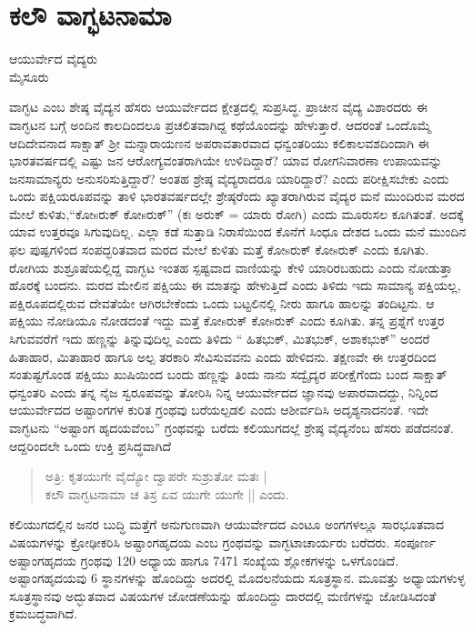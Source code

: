 \chapter{ಕಲೌ ವಾಗ್ಭಟನಾಮಾ} 

\begin{center}
\smallskip

ಆಯುರ್ವೇದ ವೈದ್ಯರು\\
ಮೈಸೂರು
\addrule
\end{center}

ವಾಗ್ಭಟ ಎಂಬ ಶೇಷ್ಠ ವೈದ್ಯನ ಹೆಸರು ಆಯುರ್ವೇದದ ಕ್ಷೇತ್ರದಲ್ಲಿ ಸುಪ್ರಸಿದ್ಧ. ಪ್ರಾಚೀನ ವೈದ್ಯ ವಿಶಾರದರು ಈ ವಾಗ್ಭಟನ ಬಗ್ಗೆ ಅಂದಿನ ಕಾಲದಿಂದಲೂ ಪ್ರಚಲಿತವಾಗಿದ್ದ ಕಥೆಯೊಂದನ್ನು ಹೇಳುತ್ತಾರೆ. ಆದರಂತೆ ಒಂದೊಮ್ಮೆ ಆದಿದೇವನಾದ  ಸಾಕ್ಷಾತ್ ಶ್ರೀ ಮನ್ನಾರಾಯಣನ ಅಪರಾವತಾರವಾದ ಧನ್ವಂತರಿಯು ಕಲಿಕಾಲವಶದಿಂದಾಗಿ ಈ ಭಾರತವರ್ಷದಲ್ಲಿ ಎಷ್ಟು ಜನ ಆರೋಗ್ಯವಂತರಾಗಿಯೇ ಉಳಿದಿದ್ದಾರೆ? ಯಾವ ರೋಗನಿವಾರಣಾ ಉಪಾಯವನ್ನು ಜನಸಾಮಾನ್ಯರು ಅನುಸರಿಸುತ್ತಿದ್ದಾರೆ? ಅಂತಹ ಶ್ರೇಷ್ಠ ವೈದ್ಯರಾದರೂ ಯಾರಿದ್ದಾರೆ? ಎಂದು ಪರೀಕ್ಷಿಸಬೇಕು ಎಂದು ಒಂದು ಪಕ್ಷಿಯರೂಪವನ್ನು ತಾಳಿ ಭಾರತವರ್ಷದಲ್ಲೇ ಶ್ರೇಷ್ಠರೆಂದು ಖ್ಯಾತರಾಗಿರುವ ವೈದ್ಯರ ಮನೆ ಮುಂದಿರುವ ಮರದ ಮೇಲೆ ಕುಳಿತು,“ಕೋsರುಕ್ ಕೋsರುಕ್” (ಕಃ ಅರುಕ್ = ಯಾರು ರೋಗಿ) ಎಂದು ಮೂರುಸಲ ಕೂಗಿತಂತೆ. ಅದಕ್ಕೆ ಯಾವ ಉತ್ತರವೂ ಸಿಗುವುದಿಲ್ಲ. ಎಲ್ಲಾ ಕಡೆ ಸುತ್ತಾಡಿ ನಿರಾಸೆಯಿಂದ ಕೊನೆಗೆ ಸಿಂಧೂ ದೇಶದ ಒಂದು ಮನೆ ಮುಂದಿನ ಫಲ ಪುಷ್ಪಗಳಿಂದ ಸಂಪದ್ಭರಿತವಾದ ಮರದ ಮೇಲೆ ಕುಳಿತು ಮತ್ತೆ ಕೋsರುಕ್ ಕೋsರುಕ್ ಎಂದು ಕೂಗಿತು. ರೋಗಿಯ ಶುಶ್ರೂಷೆಯಲ್ಲಿದ್ದ ವಾಗ್ಭಟ ಇಂತಹ ಸ್ಪಷ್ಟವಾದ ವಾಣಿಯನ್ನು ಕೇಳಿ ಯಾರಿರಬಹುದು ಎಂದು ನೋಡುತ್ತಾ ಹೊರಕ್ಕೆ ಬಂದನು. ಮರದ ಮೇಲಿನ ಪಕ್ಷಿಯು ಈ ಮಾತನ್ನು ಹೇಳುತ್ತಿದೆ ಎಂದು ತಿಳಿದು ಇದು ಸಾಮಾನ್ಯ ಪಕ್ಷಿಯಲ್ಲ, ಪಕ್ಷಿರೂಪದಲ್ಲಿರುವ ದೇವತೆಯೇ ಆಗಿರಬೇಕೆಂದು ಒಂದು ಬಟ್ಟಲಿನಲ್ಲಿ ನೀರು ಹಾಗೂ ಹಾಲನ್ನು ತಂದಿಟ್ಟನು. ಆ ಪಕ್ಷಿಯು ನೋಡಿಯೂ ನೋಡದಂತೆ ಇದ್ದು ಮತ್ತೆ ಕೋsರುಕ್ ಕೋsರುಕ್ ಎಂದು ಕೂಗಿತು. ತನ್ನ ಪ್ರಶ್ನೆಗೆ ಉತ್ತರ ಸಿಗುವವರೆಗೆ ಇದು ಹಣ್ಣನ್ನು ತಿನ್ನುವುದಿಲ್ಲ ಎಂದು ತಿಳಿದು “ ಹಿತಭುಕ್, ಮಿತಭುಕ್, ಅಶಾಕಭುಕ್” ಅಂದರೆ ಹಿತಾಹಾರ, ಮಿತಾಹಾರ ಹಾಗೂ ಅಲ್ಪ ತರಕಾರಿ ಸೇವಿಸುವವನು ಎಂದು ಹೇಳಿದನು. ತಕ್ಷಣವೇ ಈ ಉತ್ತರದಿಂದ ಸಂತುಷ್ಟಗೊಂಡ ಪಕ್ಷಿಯು ಖುಷಿಯಿಂದ ಬಂದು ಹಣ್ಣನ್ನು ತಿಂದು ನಾನು ಸದ್ವೈದ್ಯರ ಪರೀಕ್ಷೆಗೆಂದು ಬಂದ ಸಾಕ್ಷಾತ್ ಧನ್ವಂತರಿ ಎಂದು ತನ್ನ ನೈಜ ಸ್ವರೂಪವನ್ನು ತೋರಿಸಿ ನಿನ್ನ ಆಯುರ್ವೇದದ ಜ್ಞಾನವು ಅಪಾರವಾದದ್ದು, ನಿನ್ನಿಂದ ಆಯುರ್ವೇದದ ಅಷ್ಟಾಂಗಗಳ ಕುರಿತ ಗ್ರಂಥವು ಬರೆಯಲ್ಪಡಲಿ ಎಂದು ಆಶೀರ್ವದಿಸಿ ಅದೃಶ್ಯನಾದನಂತೆ. ಇದೇ ವಾಗ್ಭಟನು “ಅಷ್ಟಾಂಗ ಹೃದಯವೆಂಬ” ಗ್ರಂಥವನ್ನು ಬರೆದು ಕಲಿಯುಗದಲ್ಲೆ ಶ್ರೇಷ್ಠ ವೈದ್ಯನೆಂಬ ಹೆಸರು ಪಡೆದನಂತೆ. ಆದ್ದರಿಂದಲೇ ಒಂದು ಉಕ್ತಿ ಪ್ರಸಿದ್ಧವಾಗಿದೆ 
\begin{verse}
ಅತ್ರಿ: ಕೃತಯುಗೇ ವೈದ್ಯೋ ದ್ವಾಪರೇ ಸುಶ್ರುತೋ ಮತಃ |\\
ಕಲೌ ವಾಗ್ಭಟನಾಮಾ ಚ ತಿಸ್ರ ಏವ ಯುಗೇ ಯುಗೇ || ಎಂದು.
\end{verse}
ಕಲಿಯುಗದಲ್ಲಿನ ಜನರ ಬುದ್ಧಿ ಮತ್ತೆಗೆ ಅನುಗುಣವಾಗಿ ಆಯುರ್ವೇದದ ಎಂಟೂ ಅಂಗಗಳಲ್ಲೂ ಸಾರಭೂತವಾದ ವಿಷಯಗಳನ್ನು ಕ್ರೋಢೀಕರಿಸಿ ಅಷ್ಟಾಂಗಹೃದಯ ಎಂಬ ಗ್ರಂಥವನ್ನು ವಾಗ್ಭಟಾಚಾರ್ಯರು ಬರೆದರು. ಸಂಪೂರ್ಣ ಅಷ್ಟಾಂಗಹೃದಯ ಗ್ರಂಥವು 120 ಅಧ್ಯಾಯ ಹಾಗೂ 7471 ಸಂಖ್ಯೆಯ ಶ್ಲೋಕಗಳನ್ನು ಒಳಗೊಂಡಿದೆ. ಅಷ್ಟಾಂಗಹೃದಯವು 6 ಸ್ಥಾನಗಳನ್ನು ಹೊಂದಿದ್ದು ಅದರಲ್ಲಿ ಮೊದಲನೆಯದು ಸೂತ್ರಸ್ಥಾನ. ಮೂವತ್ತು ಅಧ್ಯಾಯಗಳುಳ್ಳ ಸೂತ್ರಸ್ಥಾನವು ಅದ್ಭುತವಾದ ವಿಷಯಗಳ ಜೋಡಣೆಯನ್ನು ಹೊಂದಿದ್ದು ದಾರದಲ್ಲಿ ಮಣಿಗಳನ್ನು ಜೋಡಿಸಿದಂತೆ ಕ್ರಮಬದ್ಧವಾಗಿದೆ.

